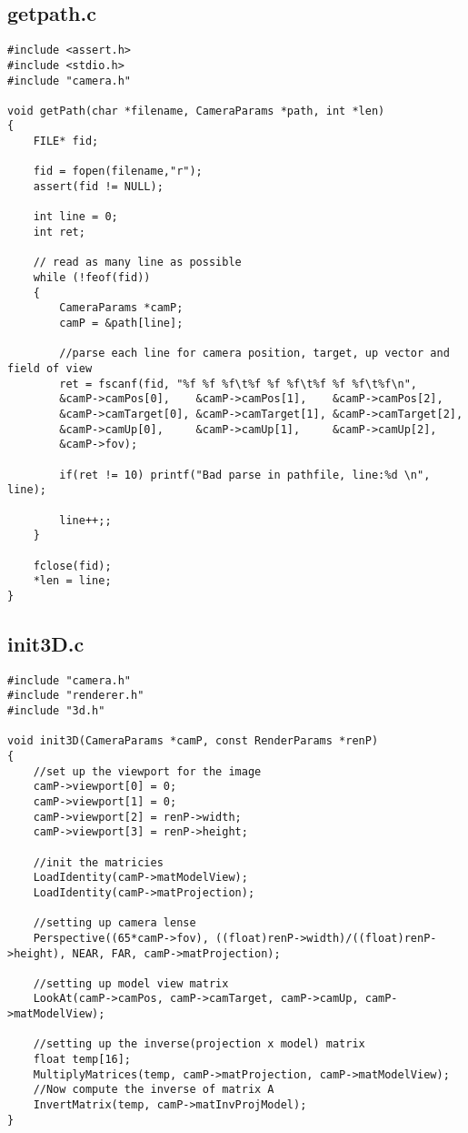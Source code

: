 \documentclass[]{article}
\begin{document}
\subsection*{getpath.c}
\begin{Verbatim}[fontsize= \footnotesize, tabsize=4]
#include <assert.h>
#include <stdio.h>
#include "camera.h"

void getPath(char *filename, CameraParams *path, int *len)
{
	FILE* fid;

	fid = fopen(filename,"r");
	assert(fid != NULL);

	int line = 0;
	int ret;

	// read as many line as possible
	while (!feof(fid))
	{
		CameraParams *camP;
		camP = &path[line];

		//parse each line for camera position, target, up vector and field of view
		ret = fscanf(fid, "%f %f %f\t%f %f %f\t%f %f %f\t%f\n",  	
		&camP->camPos[0],    &camP->camPos[1],    &camP->camPos[2],
	    &camP->camTarget[0], &camP->camTarget[1], &camP->camTarget[2],
		&camP->camUp[0],     &camP->camUp[1],     &camP->camUp[2],
		&camP->fov);

		if(ret != 10) printf("Bad parse in pathfile, line:%d \n", line);

		line++;;
	}

	fclose(fid);
	*len = line;
}

\end{Verbatim}

\subsection*{init3D.c}
\begin{Verbatim}[fontsize= \footnotesize, tabsize=4]
#include "camera.h"
#include "renderer.h"
#include "3d.h"

void init3D(CameraParams *camP, const RenderParams *renP)
{
	//set up the viewport for the image
	camP->viewport[0] = 0;
	camP->viewport[1] = 0;
	camP->viewport[2] = renP->width;
	camP->viewport[3] = renP->height;
	
	//init the matricies
	LoadIdentity(camP->matModelView);
	LoadIdentity(camP->matProjection);
	
	//setting up camera lense
	Perspective((65*camP->fov), ((float)renP->width)/((float)renP->height), NEAR, FAR, camP->matProjection);
	
	//setting up model view matrix
	LookAt(camP->camPos, camP->camTarget, camP->camUp, camP->matModelView);

	//setting up the inverse(projection x model) matrix
	float temp[16];
	MultiplyMatrices(temp, camP->matProjection, camP->matModelView);
	//Now compute the inverse of matrix A
	InvertMatrix(temp, camP->matInvProjModel);
}
\end{Verbatim}
\end{document}
